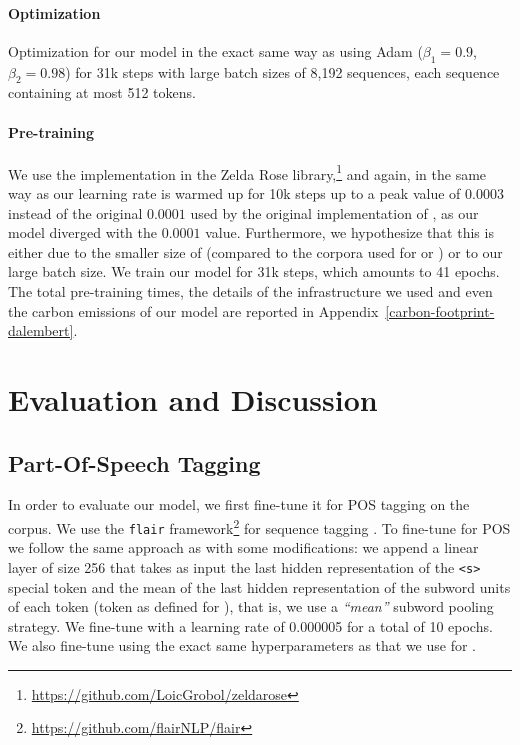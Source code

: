 \paragraph{Optimization}
Optimization for our model in the exact same way as \citep{liu-etal-2019-roberta} using Adam \citep{kingma-ba-2015-adam} ($\beta_1 = 0.9$, $\beta_2 = 0.98$) for 31k steps with large batch sizes of 8,192 sequences, each sequence containing at most 512 tokens.

\paragraph{Pre-training}
We use the \roberta implementation in the Zelda Rose library,\footnote{\url{https://github.com/LoicGrobol/zeldarose}} and again, in the same way as \citet{liu-etal-2019-roberta} our learning rate is warmed up for 10k steps up to a peak value of $0.0003$ instead of the original $0.0001$ used by the original implementation of \roberta \citep{liu-etal-2019-roberta}, as our model diverged with the $0.0001$ value. Furthermore, we hypothesize that this is either due to the smaller size of \freemmax (compared to the corpora used for \roberta or \camembert) or to our large batch size. We train our model for 31k steps, which amounts to 41 epochs. The total pre-training times, the details of the infrastructure we used and even the carbon emissions of our model are reported in Appendix~\ref{carbon-footprint-dalembert}.

\section{Evaluation and Discussion}

\subsection{Part-Of-Speech Tagging}

In order to evaluate our \dalembert model, we first fine-tune it for POS tagging on the \freemlpm corpus. We use the \texttt{flair} framework\footnote{\url{https://github.com/flairNLP/flair}} for sequence tagging \citep{akbik-etal-2019-flair}. To fine-tune \dalembert for POS we follow the same approach as \citet{schweter-akbik-2020-flert} with some modifications: we append a linear layer of size 256 that takes as input the last hidden representation of the \texttt{<s>} special token and the mean of the last hidden representation of the subword units of each token (token as defined for \freemlpm), that is, we use a \emph{``mean''} subword pooling strategy. We fine-tune \dalembert with a learning rate of 0.000005 for a total of 10 epochs. We also fine-tune \camembert using the exact same hyperparameters as that we use for \dalembert.


